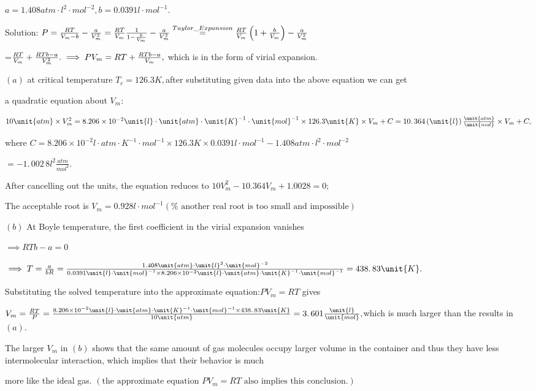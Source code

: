 \documentclass{article}
\begin{document}
$a=1.408\unit{atm}\cdot \unit{l}^{2}\cdot \unit{mol}^{-2},b=0.0391\unit{l}%
\cdot \unit{mol}^{-1}.$

Solution: $P=\frac{RT}{V_{m}-b}-\frac{a}{V_{m}^{2}}=\frac{RT}{V_{m}}\frac{1}{%
1-\frac{b}{V_{m}}}-\frac{a}{V_{m}^{2}}\overset{Taylor\_Expansion}{=}\frac{RT%
}{V_{m}}\left( 1+\frac{b}{V_{m}}\right) -\frac{a}{V_{m}^{2}}$

=$\frac{RT}{V_{m}}+\frac{RTb-a}{V_{m}^{2}}.\implies PV_{m}=RT+\frac{RTb-a}{%
V_{m}},$ which is in the form of virial expansion.

$\left( a\right) $ at critical temperature $T_{c}=126.3\unit{K},$after
substituting given data into the above equation we can get

a quadratic equation about $V_{m}:$

$10\unit{atm}\times V_{m}^{2}=8.206\times 10^{-2}\unit{l}\cdot \unit{atm}%
\cdot \unit{K}^{-1}\cdot \unit{mol}^{-1}\times 126.3\unit{K}\times
V_{m}+C=\allowbreak 10.\,\allowbreak 364\left( \unit{l}\right) \frac{\unit{%
atm}}{\unit{mol}}\times V_{m}+C,$

where $C=8.206\times 10^{-2}\unit{l}\cdot \unit{atm}\cdot \unit{K}^{-1}\cdot 
\unit{mol}^{-1}\times 126.3\unit{K}\times 0.0391\unit{l}\cdot \unit{mol}%
^{-1}-1.408\unit{atm}\cdot \unit{l}^{2}\cdot \unit{mol}^{-2}$

$=-1.\,\allowbreak 002\,8\unit{l}^{2}\frac{\unit{atm}}{\unit{mol}^{2}}.$

After cancelling out the units, the equation reduces to $%
10V_{m}^{2}-10.364V_{m}+1.0028=0;$

The acceptable root is $V_{m}=0.928\unit{l}\cdot \unit{mol}^{-1}\left( \text{%
another real root is too small and impossible}\right) $

$\left( b\right) $ At Boyle temperature, the first coefficient in the virial
expansion vanishes

$\implies RTb-a=0$

$\implies T=\frac{a}{bR}=\frac{1.408\unit{atm}\cdot \unit{l}^{2}\cdot \unit{%
mol}^{-2}}{0.0391\unit{l}\cdot \unit{mol}^{-1}\times 8.206\times 10^{-2}%
\unit{l}\cdot \unit{atm}\cdot \unit{K}^{-1}\cdot \unit{mol}^{-1}}%
=\allowbreak 438.\,\allowbreak 83\unit{K}.$

Substituting the solved temperature into the approximate equation:$PV_{m}=RT$
gives

$V_{m}=\frac{RT}{P}=\frac{8.206\times 10^{-2}\unit{l}\cdot \unit{atm}\cdot 
\unit{K}^{-1}\cdot \unit{mol}^{-1}\times \allowbreak 438.\,\allowbreak 83%
\unit{K}}{10\unit{atm}}=\allowbreak 3.\,\allowbreak 601\frac{\unit{l}}{\unit{%
mol}},$which is much larger than the results in $\left( a\right) .$

The larger $V_{m}$ in $\left( b\right) $ shows that the same amount of gas
molecules occupy larger volume in the container and thus they have less
intermolecular interaction, which implies that their behavior is much

more like the ideal gas. $\left( \text{the approximate equation }PV_{m}=RT%
\text{ also implies this conclusion.}\right) $
\end{document}
